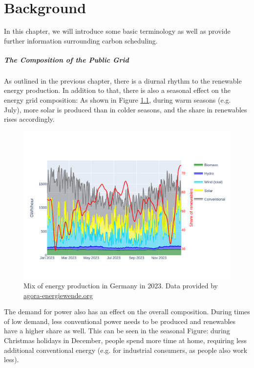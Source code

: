 \chapter{Background}

In this chapter, we will introduce some basic terminology as well as provide further information surrounding carbon scheduling.

\paragraph{The Composition of the Public Grid}

As outlined in the previous chapter, there is a diurnal rhythm to the renewable energy production.
In addition to that, there is also a seasonal effect on the energy grid composition:
As shown in Figure \ref{fig:energy_mix_year}, during warm seasons (e.g. July), more solar is produced than in colder seasons, and the share in renewables rises accordingly.

\begin{figure}
    \includegraphics[width=\linewidth]{agorameter/energy_production_year.pdf}
    \caption[short]{Mix of energy production in Germany in 2023. Data provided by \url{agora-energiewende.org}}
    \label{fig:energy_mix_year}
\end{figure}

The demand for power also has an effect on the overall composition. 
During times of low demand, less conventional power needs to be produced and renewables have a higher share as well.
This can be seen in the seasonal Figure: during Christmas holidays in December, people spend more time at home, requiring less additional conventional energy (e.g. for industrial consumers, as people also work less).

